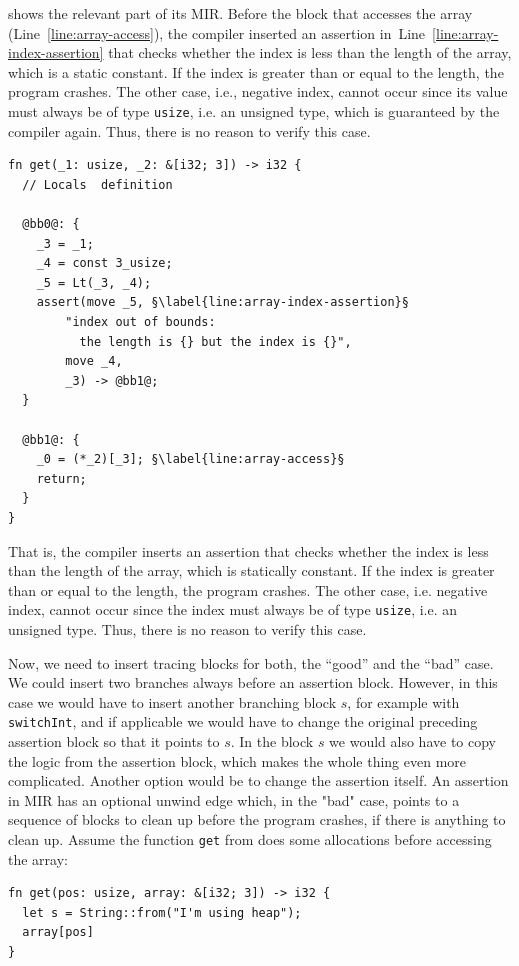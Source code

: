 \documentclass[paper=a4,%
  twoside,%
  BCOR4mm,%
  abstract=true,%
  toc=bibliography,%
  chapterprefix=true,%
  toc=bibliographynumbered,%
  open=right,%
  english,%
  pagesize=pdftex]{scrreprt}
\newcommand{\mir}{\ac{MIR}\xspace}
\begin{document}
 shows the relevant part of its \mir. Before the block that accesses the array (Line~\ref{line:array-access}), the compiler inserted an assertion in~Line~\ref{line:array-index-assertion} that checks whether the index is less than the length of the array, which is a static constant. If the index is greater than or equal to the length, the program crashes. The other case, i.e., negative index, cannot occur since its value must always be of type \texttt{usize}, i.e. an unsigned type, which is guaranteed by the compiler again. Thus, there is no reason to verify this case.

\begin{lstlisting}[language={MIR}, style=boxed, escapechar=§, caption={Compiler inserts runtime assertions at places where arrays are accessed by index}, label=lst:mir-boundary-check]
fn get(_1: usize, _2: &[i32; 3]) -> i32 {
  // Locals  definition

  @bb0@: {
    _3 = _1;
    _4 = const 3_usize;
    _5 = Lt(_3, _4);
    assert(move _5, §\label{line:array-index-assertion}§
        "index out of bounds:
          the length is {} but the index is {}",
        move _4,
        _3) -> @bb1@;
  }

  @bb1@: {
    _0 = (*_2)[_3]; §\label{line:array-access}§
    return;
  }
}
\end{lstlisting}

That is, the compiler inserts an assertion that checks whether the index is less than the length of the array, which is statically constant. If the index is greater than or equal to the length, the program crashes. The other case, i.e. negative index, cannot occur since the index must always be of type \texttt{usize}, i.e. an unsigned type. Thus, there is no reason to verify this case.

Now, we need to insert tracing blocks for both, the ``good'' and the ``bad'' case. We could insert two branches always before an assertion block. However, in this case we would have to insert another branching block $s$, for example with \texttt{switchInt}, and if applicable we would have to change the original preceding assertion block so that it points to $s$. In the block $s$ we would also have to copy the logic from the assertion block, which makes the whole thing even more complicated. Another option would be to change the assertion itself. An assertion in \mir has an optional unwind edge which, in the "bad" case, points to a sequence of blocks to clean up before the program crashes, if there is anything to clean up. Assume the function \texttt{get} from  does some allocations before accessing the array:
\begin{lstlisting}[style=boxed, caption={}]
fn get(pos: usize, array: &[i32; 3]) -> i32 {
  let s = String::from("I'm using heap");
  array[pos]
}
\end{lstlisting}
\end{document}

